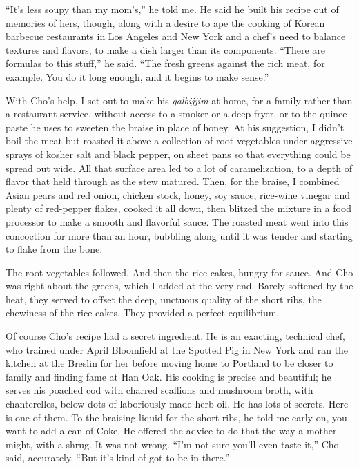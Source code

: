 ``It's less soupy than my mom's,'' he told me. He said he built his
recipe out of memories of hers, though, along with a desire to ape the
cooking of Korean barbecue restaurants in Los Angeles and New York and a
chef's need to balance textures and flavors, to make a dish larger than
its components. ``There are formulas to this stuff,'' he said. ``The
fresh greens against the rich meat, for example. You do it long enough,
and it begins to make sense.''

With Cho's help, I set out to make his \emph{galbijjim} at home, for a
family rather than a restaurant service, without access to a smoker or a
deep-fryer, or to the quince paste he uses to sweeten the braise in
place of honey. At his suggestion, I didn't boil the meat but roasted it
above a collection of root vegetables under aggressive sprays of kosher
salt and black pepper, on sheet pans so that everything could be spread
out wide. All that surface area led to a lot of caramelization, to a
depth of flavor that held through as the stew matured. Then, for the
braise, I combined Asian pears and red onion, chicken stock, honey, soy
sauce, rice-wine vinegar and plenty of red-pepper flakes, cooked it all
down, then blitzed the mixture in a food processor to make a smooth and
flavorful sauce. The roasted meat went into this concoction for more
than an hour, bubbling along until it was tender and starting to flake
from the bone.

The root vegetables followed. And then the rice cakes, hungry for sauce.
And Cho was right about the greens, which I added at the very end.
Barely softened by the heat, they served to offset the deep, unctuous
quality of the short ribs, the chewiness of the rice cakes. They
provided a perfect equilibrium.

Of course Cho's recipe had a secret ingredient. He is an exacting,
technical chef, who trained under April Bloomfield at the Spotted Pig in
New York and ran the kitchen at the Breslin for her before moving home
to Portland to be closer to family and finding fame at Han Oak. His
cooking is precise and beautiful; he serves his poached cod with charred
scallions and mushroom broth, with chanterelles, below dots of
laboriously made herb oil. He has lots of secrets. Here is one of them.
To the braising liquid for the short ribs, he told me early on, you want
to add a can of Coke. He offered the advice to do that the way a mother
might, with a shrug. It was not wrong. ``I'm not sure you'll even taste
it,'' Cho said, accurately. ``But it's kind of got to be in there.''

